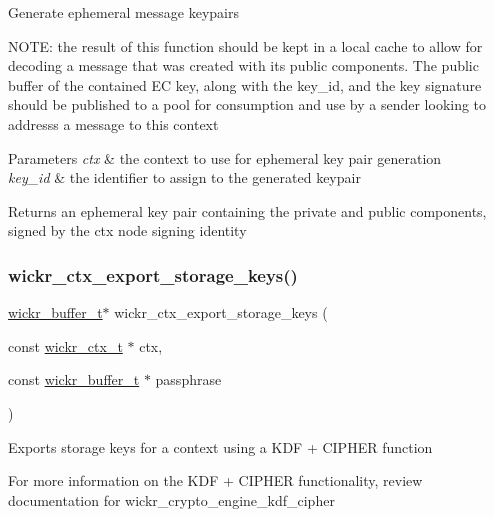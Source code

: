 Generate ephemeral message keypairs

N\+O\+TE\+: the result of this function should be kept in a local cache to allow for decoding a message that was created with it\textquotesingle{}s public components. The public buffer of the contained EC key, along with the key\+\_\+id, and the key signature should be published to a pool for consumption and use by a sender looking to addresss a message to this context


\begin{DoxyParams}{Parameters}
{\em ctx} & the context to use for ephemeral key pair generation \\
\hline
{\em key\+\_\+id} & the identifier to assign to the generated keypair \\
\hline
\end{DoxyParams}
\begin{DoxyReturn}{Returns}
an ephemeral key pair containing the private and public components, signed by the ctx node signing identity 
\end{DoxyReturn}
\mbox{\label{group__wickr__ctx_ga67e64bed3fc0a8ee550c0fc24d44c787}} 
\subsubsection{\texorpdfstring{wickr\+\_\+ctx\+\_\+export\+\_\+storage\+\_\+keys()}{wickr\_ctx\_export\_storage\_keys()}}
{\footnotesize\ttfamily \mbox{\hyperlink{structwickr__buffer}{wickr\+\_\+buffer\+\_\+t}}$\ast$ wickr\+\_\+ctx\+\_\+export\+\_\+storage\+\_\+keys (\begin{DoxyParamCaption}\item[{const \mbox{\hyperlink{structwickr__ctx}{wickr\+\_\+ctx\+\_\+t}} $\ast$}]{ctx,  }\item[{const \mbox{\hyperlink{structwickr__buffer}{wickr\+\_\+buffer\+\_\+t}} $\ast$}]{passphrase }\end{DoxyParamCaption})}

Exports storage keys for a context using a K\+DF + C\+I\+P\+H\+ER function

For more information on the K\+DF + C\+I\+P\+H\+ER functionality, review documentation for \textquotesingle{}wickr\+\_\+crypto\+\_\+engine\+\_\+kdf\+\_\+cipher\textquotesingle{}

